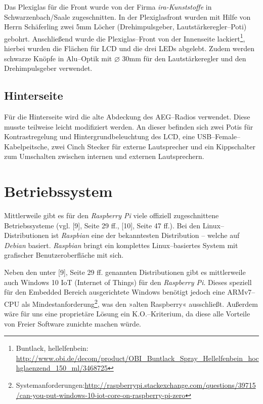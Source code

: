 \documentclass[11pt,ngerman,toc=listof,index=totoc]{scrreprt}
\begin{document}
Das Plexiglas für die Front wurde von der Firma \emph{ira-Kunststoffe}
in Schwarzenbach/Saale zugeschnitten. In der Plexiglasfront wurden mit
Hilfe von Herrn Schäferling zwei 5mm Löcher (Drehimpulsgeber,
Lautstärkeregler--Poti) gebohrt. Anschließend wurde die Plexiglas--Front
von der Innenseite lackiert\footnote{Buntlack, hellelfenbein:
  \url{http://www.obi.de/decom/product/OBI_Buntlack_Spray_Hellelfenbein_hochglaenzend_150_ml/3468725}},
hierbei wurden die Flächen für LCD und die drei LEDs abgelebt. Zudem
werden schwarze Knöpfe in Alu--Optik mit \(\diameter\) 30mm für den
Lautstärkeregler und den Drehimpulsgeber verwendet.

\subsection{Hinterseite}\label{hinterseite}

Für die Hinterseite wird die alte Abdeckung des AEG--Radios verwendet.
Diese musste teilweise leicht modifiziert werden. An dieser befinden
sich zwei Potis für Kontrastregelung und Hintergrundbeleuchtung des LCD,
eine USB--Female--Kabelpeitsche, zwei Cinch Stecker für externe
Lautsprecher und ein Kippschalter zum Umschalten zwischen internen und
externen Lautsprechern.

\section{Betriebssystem}\label{betriebssystem}

Mittlerweile gibt es für den \emph{Raspberry Pi} viele offiziell
zugeschnittene Betriebssysteme (vgl. {[}9{]}, Seite 29 ff., {[}10{]},
Seite 47 ff.). Bei den Linux--Distributionen ist \emph{Raspbian} eine
der bekanntesten Distribution -- welche auf \emph{Debian} basiert.
\emph{Raspbian} bringt ein komplettes Linux--basiertes System mit
grafischer Benutzeroberfläche mit sich.

Neben den unter {[}9{]}, Seite 29 ff. genannten Distributionen gibt es
mittlerweile auch Windows 10 IoT (Internet of Things) für den
\emph{Raspberry Pi}. Dieses speziell für den Embedded Bereich
ausgerichtete Windows benötigt jedoch eine ARMv7--CPU als
Mindestanforderung\footnote{Systemanforderungen:\url{http://raspberrypi.stackexchange.com/questions/39715/can-you-put-windows-10-iot-core-on-raspberry-pi-zero}},
was den »alten Raspberry« ausschließt. Außerdem wäre für uns eine
proprietäre Lösung ein K.O.--Kriterium, da diese alle Vorteile von
Freier Software zunichte machen würde.
\end{document}
